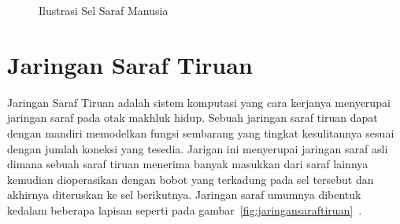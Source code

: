 \begin{figure}[htbp]
    \begin{center}
    \end{center}
    \vspace{-20pt}
    \captionsetup{labelfont=bf, textfont=bf}
    \caption{Ilustrasi Sel Saraf Manusia}
    \vspace{-10pt}
    \captionsetup{labelfont=md, textfont=md}
    \label{fig:selsaraf}
\end{figure}

\section{Jaringan Saraf Tiruan}
\label{sec:2-JaringanSarafTiruan}

Jaringan Saraf Tiruan adalah sistem komputasi yang cara kerjanya menyerupai jaringan saraf pada otak
makhluk hidup. Sebuah jaringan saraf tiruan dapat dengan mandiri
memodelkan fungsi sembarang yang tingkat kesulitannya sesuai dengan jumlah koneksi yang tesedia.
Jarigan ini menyerupai jaringan saraf asli dimana
sebuah saraf tiruan menerima banyak masukkan dari saraf lainnya
kemudian dioperasikan dengan bobot yang terkadung pada sel tersebut dan akhirnya diteruskan ke sel
berikutnya. Jaringan saraf umumnya dibentuk kedalam beberapa lapisan seperti pada
gambar~\ref{fig:jaringansaraftiruan}~\cite{croann}.

